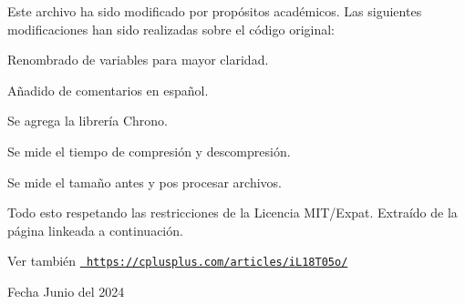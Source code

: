 Este archivo ha sido modificado por propósitos académicos. Las siguientes modificaciones han sido realizadas sobre el código original\+:
\begin{DoxyItemize}
\item Renombrado de variables para mayor claridad.
\item Añadido de comentarios en español.
\item Se agrega la librería Chrono.
\item Se mide el tiempo de compresión y descompresión.
\item Se mide el tamaño antes y pos procesar archivos.
\end{DoxyItemize}

Todo esto respetando las restricciones de la Licencia MIT/\+Expat. Extraído de la página linkeada a continuación. \begin{DoxySeeAlso}{Ver también}
\href{https://cplusplus.com/articles/iL18T05o/}{\texttt{ https\+://cplusplus.\+com/articles/i\+L18\+T05o/}}
\end{DoxySeeAlso}
\begin{DoxyDate}{Fecha}
Junio del 2024 
\end{DoxyDate}
